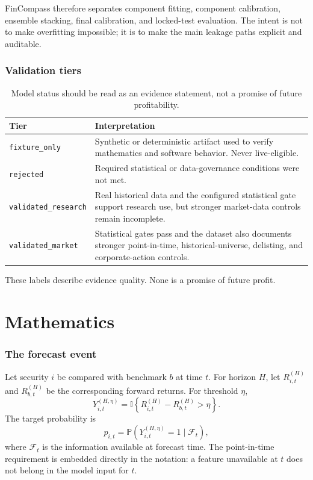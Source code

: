 \documentclass[11pt]{article}
\newcommand{\Prb}{\mathbb{P}}
\newcommand{\I}{\mathbb{I}}
\begin{document}
FinCompass therefore separates component fitting, component calibration, ensemble stacking, final calibration, and locked-test evaluation. The intent is not to make overfitting impossible; it is to make the main leakage paths explicit and auditable.

\section{Validation tiers}

\begin{table}[tbp]
\centering
\small
\caption{Model status should be read as an evidence statement, not a promise of future profitability.}
\begin{tabularx}{\textwidth}{@{}p{}X@{}}
\toprule
Tier & Interpretation \\
\midrule
\texttt{fixture\_only} & Synthetic or deterministic artifact used to verify mathematics and software behavior. Never live-eligible. \\
\texttt{rejected} & Required statistical or data-governance conditions were not met. \\
\texttt{validated\_research} & Real historical data and the configured statistical gate support research use, but stronger market-data controls remain incomplete. \\
\texttt{validated\_market} & Statistical gates pass and the dataset also documents stronger point-in-time, historical-universe, delisting, and corporate-action controls. \\
\bottomrule
\end{tabularx}
\end{table}

These labels describe evidence quality. None is a promise of future profit.

\part{Mathematics}

\section{The forecast event}

Let security $i$ be compared with benchmark $b$ at time $t$. For horizon $H$, let $R_{i,t}^{(H)}$ and $R_{b,t}^{(H)}$ be the corresponding forward returns. For threshold $\eta$,
\begin{equation}
Y_{i,t}^{(H,\eta)}=\I\left\{R_{i,t}^{(H)}-R_{b,t}^{(H)}>\eta\right\}.
\end{equation}
The target probability is
\begin{equation}
p_{i,t}=\Prb\left(Y_{i,t}^{(H,\eta)}=1\mid\mathcal F_t\right),
\end{equation}
where $\mathcal F_t$ is the information available at forecast time. The point-in-time requirement is embedded directly in the notation: a feature unavailable at $t$ does not belong in the model input for $t$.
\end{document}
